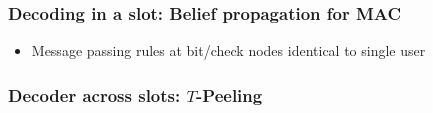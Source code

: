 \begin{frame}\frametitle{Decoding in a slot: Belief propagation for MAC }
\begin{itemize}
\item Message passing rules at bit/check nodes identical to single user
\end{itemize}

	\centering
	\vspace{2ex}
	\resizebox{0.85\textwidth}{!}{}
\end{frame}


\begin{frame}
\frametitle{Decoder across slots: $T$-Peeling}
\centering
\resizebox{0.85\textwidth}{!}{}
\end{frame}


